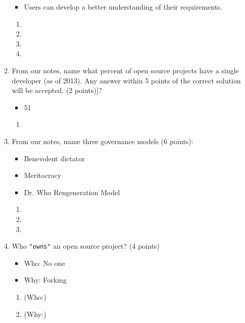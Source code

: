 \documentclass[10pt]{article}
\begin{document}
\begin{enumerate}
\begin{enumerate}
\begin{itemize}
	    \item Users can develop a better understanding of their requirements.
            \end{itemize}
        \else
            \begin{enumerate}
	    \item 
	    \bigskip
	    \bigskip
	    \item
	    \bigskip
	    \bigskip
	    \item 
	    \bigskip
	    \bigskip
	    \item 
            \bigskip
            \bigskip
            \end{enumerate}
        \fi
    \bigskip
    \bigskip
    \item From our notes, name what percent of open source projects have a single developer (as of 2013). Any answer within 5 points of the correct solution will be accepted. (2 points)]?
        \beginanswers
            \begin{itemize}
	    \item 51%
            \end{itemize}
        \else
            \begin{enumerate}
	    \item
	    \bigskip
	    \bigskip
            \end{enumerate}
        \fi
    \bigskip
    \bigskip
    \item From our notes, name three governance models (6 points):
        \beginanswers
            \begin{itemize}
	    \item Benevolent dictator
	    \item Meritocracy
	    \item Dr. Who Rengeneration Model
            \end{itemize}
        \else
            \begin{enumerate}
	    \item 
	    \bigskip
	    \bigskip
	    \item
	    \bigskip
	    \bigskip
	    \item 
	    \bigskip
	    \bigskip
            \end{enumerate}
        \fi
    \bigskip
    \bigskip
    \item Who \verb|"owns"| an open source project? (4 points)
        \beginanswers
            \begin{itemize}
	    \item Who: No one
	    \item Why: Forking
	    \end{itemize}
        \else
            \begin{enumerate}
	    \item (Who:)
	    \bigskip
	    \bigskip
	    \item (Why:)
	    \bigskip
	    \bigskip
	    \end{enumerate}
        \fi
    \end{enumerate}


\end{enumerate}
\end{document}

